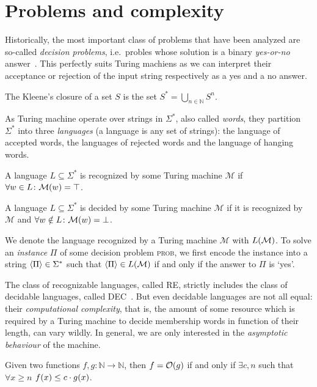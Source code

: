 \section{Problems and complexity}\label{sec:complexity}
Historically, the most important class of problems that have been analyzed are so-called
\emph{decision problems}, i.e.\ probles whose solution is a binary \emph{yes-or-no} 
answer~\cite{Sipser2013}.
This perfectly suits Turing machiens as we can interpret their acceptance or rejection of the input 
string respectively as a yes and a no answer.

\begin{definition}
  The Kleene's closure of a set \(S\) is the set \(S^* = \bigcup_{n \in \mathbb{N}}{S^n}\).
\end{definition}

As Turing machine operate over strings in \(\Sigma^*\), also called \emph{words}, they partition 
\(\Sigma^* \) into three \emph{languages} (a language is any set of strings): the language of 
accepted words, the languages of rejected words and the language of hanging words.
\begin{definition}
  A language \(L \subseteq \Sigma^*\) is recognized by some Turing machine \(\mathcal{M}\) if 
  \(\forall w \in L\colon \call{\mathcal{M}}{w} = \top \).
\end{definition}
\begin{definition}
  A language \(L \subseteq \Sigma^*\) is decided by some Turing machine \(\mathcal{M}\) if it is 
  recognized by \(\mathcal{M}\) and \(\forall w \notin L\colon \call{\mathcal{M}}{w} = \bot \).
\end{definition}

We denote the language recognized by a Turing machine \(\mathcal{M}\) with \(\call{L}{\mathcal{M}}\).
To solve an \emph{instance} \(\Pi \) of some decision problem \textsc{prob}, we first encode the 
instance into a string \(\left\langle\Pi\right\rangle \in \Sigma^*\) such that 
\(\Encode{\Pi} \in \call{L}{\mathcal{M}}\) if and only if the answer to \(\Pi \) is `yes'.

The class of recognizable languages, called \textsc{RE}, strictly includes the class of decidable 
languages, called \textsc{DEC}~\cite{Turing1937}.
But even decidable languages are not all equal: their \emph{computational complexity}, that is,
the amount of some resource which is required by a Turing machine to decide membership words in 
function of their length, can vary wildly.
In general, we are only interested in the \emph{asymptotic behaviour} of the machine.
\begin{definition}
  Given two functions \(f, g\colon \mathbb{N} \to \mathbb{N}\), then \(f = \BigO{g}\) if 
  and only if \(\exists c,n\) such that \(\forall x \ge n\) \(\call{f}{x} \le c \cdot \call{g}{x}\).
\end{definition}

